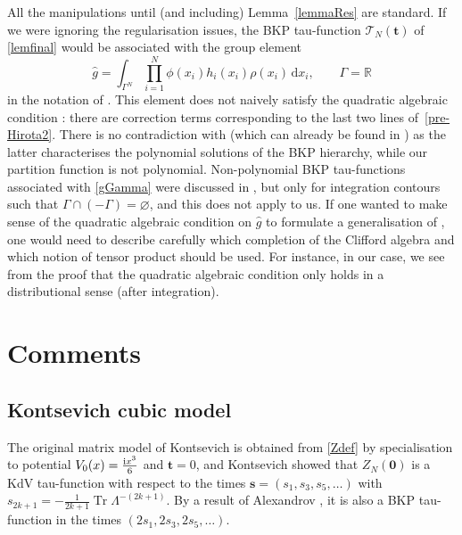 \documentclass[pdftex]{sigma}
\numberwithin{equation}{section}
\newcommand{\dd}{\mathrm{d}}
\begin{document}
\begin{Remark} \label{RemarkBKP}

All the manipulations until (and including) Lemma~\ref{lemmaRes} are standard. If we were ignoring the regularisation issues,
the BKP tau-function $\mathcal{T}_N(\mathbf{t})$ of \eqref{lemfinal} would
be associated with the group element
\begin{equation}
\label{gGamma}
\hat{g} = \int_{\Gamma^N} \prod_{i = 1}^{N} \phi(x_i) h_i(x_i)\rho(x_i)\,\dd x_i,
\qquad \Gamma = \mathbb{R}
\end{equation}
in the notation of \cite[Section 7.3]{harnad_balogh_2021}. This element
does not naively satisfy the quadratic algebraic condition
\cite[equation 7.3.63]{harnad_balogh_2021}:
there are correction terms corresponding to the last two lines of~\eqref{pre-Hirota2}. There is no contradiction
with \cite[Theorem 7.3.10]{harnad_balogh_2021} (which can already be
found in \cite{Date:1981qz}) as the latter characterises the
polynomial solutions of the BKP hierarchy, while our partition
function is not polynomial. Non-polynomial BKP tau-functions
associated with \eqref{gGamma} were discussed in
\cite{harnad_balogh_2021}, but only for integration contours such that
$\Gamma \cap (-\Gamma) = \varnothing$, and this does not apply to us. If
one wanted to make sense of the quadratic algebraic condition on $\hat{g}$
to formulate a generalisation of \cite[Theorem
7.3.10]{harnad_balogh_2021}, one would need to describe carefully
which completion of the Clifford algebra and which notion of tensor
product should be used. For instance, in our case, we see from the
proof that the quadratic algebraic condition only holds in a
distributional sense (after integration).
\end{Remark}

\section{Comments}\label{section4}

\subsection{Kontsevich cubic model} The original matrix model of Kontsevich \cite{Kontsevich:1992ti} is obtained from \eqref{Zdef} by specialisation to potential $V_0(x) = \frac{{\rm i}x^3}{6}$ and $\mathbf{t} = 0$, and Kontsevich showed that $Z_N(\mathbf{0})$ is a KdV tau-function with respect to the times $\mathbf{s} = (s_1,s_3,s_5,\dots)$ with $s_{2k + 1} = - \frac{1}{2k + 1} \operatorname{Tr}\Lambda^{-(2k +1)}$. By a result of Alexandrov
\cite{Alexandrov:2020nzt}, it is also a BKP tau-function in the times $(2s_1,2s_3,2s_5,\dots)$.
\end{document}
